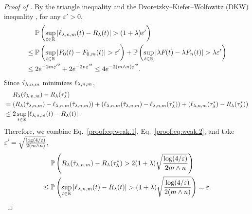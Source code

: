 \begin{proof}[Proof of ]
    By the triangle inequality and the Dvoretzky–Kiefer–Wolfowitz (DKW) inequality \cite{dvoretzky1956asymptotic, massart1990tight}, for any $\varepsilon' > 0$,
    \begin{align}\label{proof:eq:weak.1}
    \begin{split}
        &\quad~\mathbb{P}\left(\sup_{{t} \in \mathbb{R}}\left|
        {{\ell}_{\lambda, {n}, m}}({t})
        - {R_{\lambda}}({t})\right| > (1+\lambda) \varepsilon' \right)\\
        &\le \mathbb{P}\left(\sup_{{t} \in \mathbb{R}}\left|
        {F_{0}}({t})
        - {{F}_{0,m}}({t})\right| > \varepsilon' \right) +  \mathbb{P}\left(\sup_{{t} \in \mathbb{R}}\left|
        \lambda{F_{}}({t})
        - \lambda{{F}_n}({t})\right| > \lambda \varepsilon' \right)\\
        &\le 2 e^{-2 m\varepsilon'^2} + 2 e^{-2{n}\varepsilon'^2}
        \le  4 e^{-2 (m \wedge {n})\varepsilon'^2}.
        \end{split}
    \end{align}
    Since ${\hat{\tau}_{\lambda, {n}, m}}$ minimizes ${{\ell}_{\lambda, {n}, m}}$,
    \begin{align}\label{proof:eq:weak.2}
    \begin{split}
        &\quad~{R_{\lambda}}({\hat{\tau}_{\lambda, {n}, m}}) - {R_{\lambda}}({\tau^*_\lambda}) \\
        &= \left({R_{\lambda}}({\hat{\tau}_{\lambda, {n}, m}}) - {{\ell}_{\lambda, {n}, m}}({\hat{\tau}_{\lambda, {n}, m}})\right) +
        \left({{\ell}_{\lambda, {n}, m}}({\hat{\tau}_{\lambda, {n}, m}}) -  {{\ell}_{\lambda, {n}, m}}({\tau^*_\lambda})\right) +  \left({{\ell}_{\lambda, {n}, m}}({\tau^*_\lambda}) -  {R_{\lambda}}({\tau^*_\lambda})\right)  \\
        &\le 2 \sup_{{t} \in \mathbb{R}}\left|
        {{\ell}_{\lambda, {n}, m}}({t})
        - {R_{\lambda}}({t})\right|.
    \end{split}
    \end{align}
    Therefore, we combine Eq.~\eqref{proof:eq:weak.1}, Eq.~\eqref{proof:eq:weak.2}, and take $\varepsilon' = \sqrt{\frac{\log(4/\varepsilon)}{2 (m \wedge {n})}}$,
    \begin{align*}
        &\quad~\mathbb{P}\left({R_{\lambda}}({\hat{\tau}_{\lambda, {n}, m}}) - {R_{\lambda}}({\tau^*_\lambda}) > 2 (1+\lambda)\sqrt{\frac{\log(4/\varepsilon)}{2 m \wedge {n}}} \right) \\
        &\le \mathbb{P}\left(\sup_{{t} \in \mathbb{R}}\left|
        {{\ell}_{\lambda, {n}, m}}({t})
        - {R_{\lambda}}({t})\right| > (1+\lambda) \sqrt{\frac{\log(4/\varepsilon)}{2 (m \wedge {n})}}  \right)
        = \varepsilon.
    \end{align*}
\end{proof}

